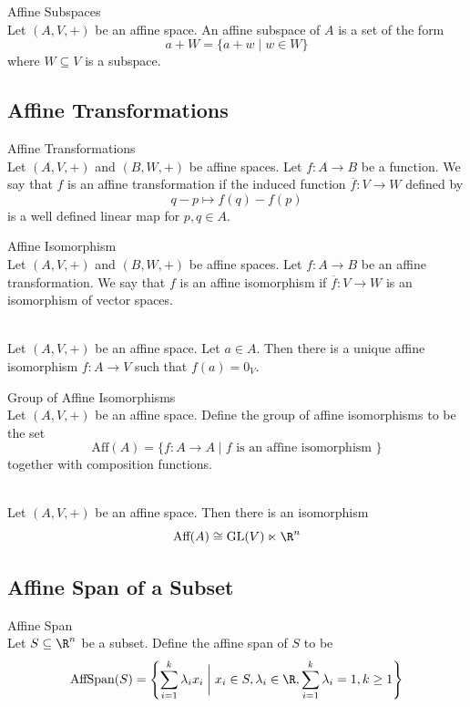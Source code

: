 \documentclass[a4paper]{article}
\begin{document}
\begin{defn}{Affine Subspaces}{}\\
Let $(A,V,+)$ be an affine space. An affine subspace of $A$ is a set of the form $$a+W=\{a+w\;|\;w\in W\}$$ where $W\subseteq V$ is a subspace. 
\end{defn}

\subsection{Affine Transformations}
\begin{defn}{Affine Transformations}{}\\
Let $(A,V,+)$ and $(B,W,+)$ be affine spaces. Let $f:A\to B$ be a function. We say that $f$ is an affine transformation if the induced function $\overline{f}:V\to W$ defined by $$q-p\mapsto f(q)-f(p)$$ is a well defined linear map for $p,q\in A$. 
\end{defn}

\begin{defn}{Affine Isomorphism}{}\\
Let $(A,V,+)$ and $(B,W,+)$ be affine spaces. Let $f:A\to B$ be an affine transformation. We say that $f$ is an affine isomorphism if $\overline{f}:V\to W$ is an isomorphism of vector spaces. 
\end{defn}

\begin{prp}{}{}\\
Let $(A,V,+)$ be an affine space. Let $a\in A$. Then there is a unique affine isomorphism $f:A\to V$ such that $f(a)=0_V$. 
\end{prp}

\begin{defn}{Group of Affine Isomorphisms}{}\\
Let $(A,V,+)$ be an affine space. Define the group of affine isomorphisms to be the set $$\text{Aff}(A)=\{f:A\to A\;|\;f\text{ is an affine isomorphism }\}$$ together with composition functions. 
\end{defn}

\begin{prp}{}{}\\
Let $(A,V,+)$ be an affine space. Then there is an isomorphism $$\text{Aff}(A)\cong\text{GL}(V)\ltimes\R^n$$
\end{prp}

\subsection{Affine Span of a Subset}
\begin{defn}{Affine Span}{}\\
Let $S\subseteq\R^n$ be a subset. Define the affine span of $S$ to be $$\text{AffSpan}(S)=\left\{\sum_{i=1}^k\lambda_ix_i\;\bigg{|}\;x_i\in S,\lambda_i\in\R,\sum_{i=1}^k\lambda_i=1,k\geq 1\right\}$$
\end{defn}
\end{document}
